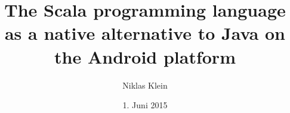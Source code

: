 \title{The Scala programming language as a native alternative to Java on the Android platform}
\date{1. Juni 2015}
\author{Niklas Klein}

\begin{titlepage}

	\maketitle

\end{titlepage}